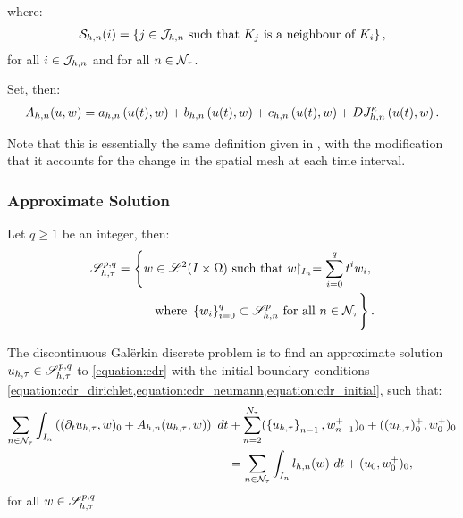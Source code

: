 \newpage
where:
\begin{align}
    \mathcal{S}_{h, n}(i) = \left\{ j \in \mathcal{J}_{h, n} \text{ such that } K_j \text{ is a neighbour of } K_i \right\},
\end{align}
for all $i \in \mathcal{J}_{h, n}$ and for all $n \in \mathcal{N}_{\tau}$.

Set, then:
\begin{align}
    A_{h, n}(u, w) = a_{h, n} \left( u(t), w \right) + b_{h, n} \left( u(t), w \right) + c_{h, n} \left( u(t), w \right) + D J^{\kappa}_{h, n} \left( u(t), w \right) \label{equation:cdr_Ahn}.
\end{align}

Note that this is essentially the same definition given in , with the modification that it accounts for the change in the spatial mesh at each time interval.

\newpage
\subsubsection{Approximate Solution}

\begin{definition}[$\SpaceSolutionFull$]
    Let $q \geq 1$ be an integer, then:
    \begin{align} %
        \SpaceSolutionFull = \left\{ w \in \SpaceLp{2}(I \times \Omega) \text{ such that } w \Restriction_{I_n} = \sum_{i = 0}^q t^i w_i, \right. \\ 
        \left. \vphantom{\sum_{i = 0}^q} \text{ where } \left\{ w_i \right\}_{i = 0}^q \subset \SpaceSolution_{h, n}^p \text{ for all } n \in \TimeIndices \right\}. \notag
    \end{align}
\end{definition}

The discontinuous Galërkin discrete problem is to find an approximate solution $u_{h, \tau} \in \mathscr{S}^{p, q}_{h, \tau}$ to \cref{equation:cdr} with the initial-boundary conditions \cref{equation:cdr_dirichlet,equation:cdr_neumann,equation:cdr_initial}, such that:
\begin{align} %
    \sum_{n \in \TimeIndices} \int_{I_n} \left( (\partial_t u_{h, \tau}, w )_0 + A_{h, n}(u_{h, \tau}, w) \right) ~ dt \notag &+ \sum_{n = 2}^{\nTimeIndices} (\left\{ u_{h, \tau} \right\}_{n - 1}, w_{n - 1}^+ )_0 + ((u_{h, \tau})_0^+, w_0^+ )_0 \notag \\
    &= \sum_{n \in \TimeIndices} \int_{I_n} l_{h, n}(w) ~ dt + (u_0, w_0^+ )_0, \label{equation:cdr_discrete}
\end{align}
for all $w \in \mathscr{S}^{p, q}_{h, \tau}$

